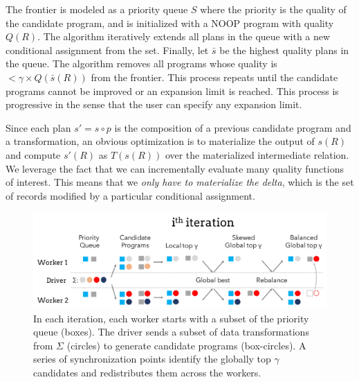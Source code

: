 The frontier is modeled as a priority queue $S$ where the priority is the quality of the candidate program, and is initialized with a NOOP program with quality $Q(R)$.  
The algorithm iteratively extends all plans in the queue with a new conditional assignment from the set. 
Finally, let $\bar{s}$ be the highest quality plans in the queue.  The algorithm removes all programs whose quality is $<\gamma\times Q(\bar{s}(R))$ from the frontier.  
This process repeats until the candidate programs cannot be improved or an expansion limit is reached.
This process is progressive in the sense that the user can specify any expansion limit.

Since each plan $s' = s\circ p$ is the composition of a previous candidate program and a transformation, an obvious optimization is to materialize the output of $s(R)$ and compute $s'(R)$ as $T(s(R))$ over the materialized intermediate relation.
We leverage the fact that we can incrementally evaluate many quality functions of interest.
This means that we \emph{only have to materialize the delta}, which is the set of records modified by a particular conditional assignment.

\begin{figure}[t]
    \centering
    \includegraphics[width=\columnwidth]{figures/distributed.pdf}
    \caption{In each iteration, each worker starts with a subset of the priority queue (boxes).  The driver sends a subset of data transformations from $\Sigma$ (circles) to generate candidate programs (box-circles).  A series of synchronization points identify the globally top $\gamma$ candidates and redistributes them across the workers.   \label{fig:algo}}
\end{figure}


